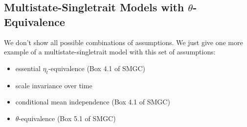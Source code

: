 \documentclass[10pt]{article}\usepackage[]{graphicx}\usepackage[]{xcolor}
\begin{document}
\subsection{Multistate-Singletrait Models with $\theta$-Equivalence}

We don't show all possible combinations of assumptions. We just give one more example of a multistate-singletrait model with this set of assumptions:
%
\begin{itemize}
  \item essential $\eta_t$-equivalence (Box 4.1 of SMGC)
  \item scale invariance over time
  \item conditional mean independence (Box 4.1 of SMGC)
  \item $\theta$-equivalence (Box 5.1 of SMGC)
\end{itemize}
%
%
\end{document}
